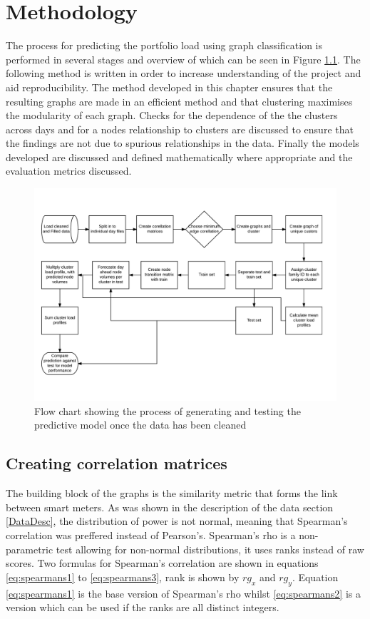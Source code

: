 \chapter{Methodology}
\label{Method}

The process for predicting the portfolio load using graph classification is performed in several stages and overview of which can be seen in Figure \ref{fig:ProcessFlow}. The following method is written in order to increase understanding of the project and aid reproducibility. The method developed in this chapter ensures that the resulting graphs are made in an efficient method and that clustering maximises the modularity of each graph. Checks for the dependence of the the clusters across days and for a nodes relationship to clusters are discussed to ensure that the findings are not due to spurious relationships in the data. Finally the models developed are discussed and defined mathematically where appropriate and the evaluation metrics discussed.

\begin{figure}[ht]
    \centering
    \includegraphics[width =\textwidth]{Figures/Appendix/Thesisprocess.png}
    \caption[Project process]{Flow chart showing the process of generating and testing the predictive model once the data has been cleaned}
    \label{fig:ProcessFlow}
\end{figure}


\section{Creating correlation matrices}
\label{sec:cormat}
The building block of the graphs is the similarity metric that forms the link between smart meters. As was shown in the description of the data section \ref{DataDesc}, the distribution of power is not normal, meaning that Spearman's correlation \cite{spearmansrankcorrelationcoefficient2016} was preffered instead of Pearson's. Spearman's rho is a non-parametric test allowing for non-normal distributions, it uses ranks instead of raw scores. Two formulas for Spearman's correlation are shown in equations \ref{eq:spearmans1} to \ref{eq:spearmans3}, rank is shown by $rg_x$ and $rg_y$. Equation \ref{eq:spearmans1} is the base version of Spearman's rho whilst \ref{eq:spearmans2} is a version which can be used if the ranks are all distinct integers.


